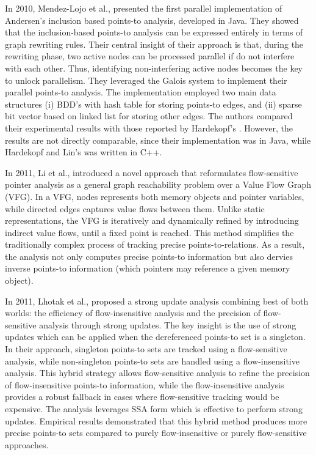 In 2010, Mendez-Lojo et al., \cite{mendez2010parallel} presented the first parallel implementation of Andersen's inclusion based points-to analysis, developed in Java. 
They showed that the inclusion-based points-to analysis can be expressed entirely in terms of graph rewriting rules.
Their central insight of their approach is that, during the rewriting phase, two active nodes can be processed parallel if do not interfere with each other.
Thus, identifying non-interfering active nodes becomes the key to unlock parallelism.
They leveraged the Galois system \cite{galois} to implement their parallel points-to analysis.
The implementation employed two main data structures (i) BDD's with hash table for storing points-to edges, and (ii) sparse bit vector based on linked list for storing other edges. 
The authors compared their experimental results with those reported by Hardekopf's \cite{hardekopf2009semi}.
However, the results are not directly comparable, since their implementation was in Java, while Hardekopf and Lin’s was written in C++.


In 2011, Li et al., \cite{li2011boosting} introduced a novel approach that reformulates flow-sensitive pointer analysis as a general graph reachability problem over a Value Flow Graph (VFG).
In a VFG, nodes represents both memory objects and pointer variables, while directed edges captures value flows between them.
Unlike static representations, the VFG is iteratively and dynamically refined by introducing indirect value flows, until a fixed point is reached.
This method simplifies the traditionally complex process of tracking precise points-to-relations.
As a result, the analysis not only computes precise points-to information but also dervies inverse points-to information (which pointers may reference a given memory object).

In 2011, Lhotak et al., \cite{lhotak2011points} proposed a strong update analysis combining best of both worlds: the efficiency of flow-insensitive analysis and the precision of flow-sensitive analysis through strong updates.
The key insight is the use of strong updates which can be applied when the dereferenced points-to set is a singleton. 
In their approach, singleton points-to sets are tracked using a flow-sensitive analysis, while non-singleton points-to sets are handled using a flow-insensitive analysis.
This hybrid strategy allows flow-sensitive analysis to refine the precision of flow-insensitive points-to information, while the flow-insensitive analysis provides a robust fallback in cases where flow-sensitive tracking would be expensive.
The analysis leverages SSA form which is effective to perform strong updates. Empirical results demonstrated that this hybrid method produces more precise points-to sets compared to purely flow-insensitive or purely flow-sensitive approaches.

